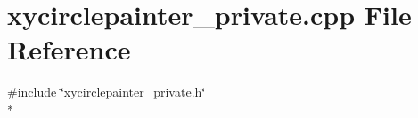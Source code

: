 \section{xycirclepainter\+\_\+private.\+cpp File Reference}
\label{circles_2xycirclepainter__private_8cpp}
{\ttfamily \#include \char`\"{}xycirclepainter\+\_\+private.\+h\char`\"{}}\\*
